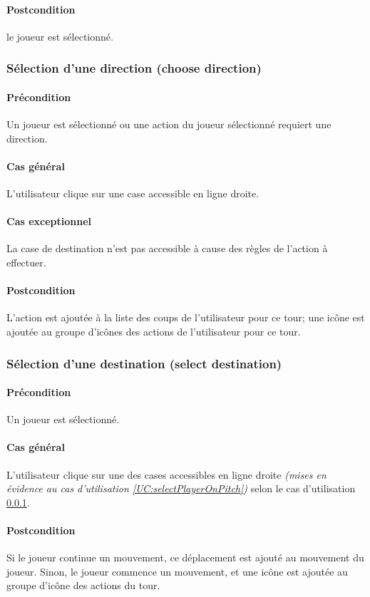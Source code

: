     \paragraph{Postcondition} le joueur est sélectionné. 

\subsubsection{Sélection d'une direction (choose direction)}
    \label{UC:selectDirection}
    \paragraph{Précondition} Un joueur est sélectionné ou une action du joueur sélectionné requiert une direction.
    \paragraph{Cas général} L'utilisateur clique sur une case accessible en ligne droite.
    \paragraph{Cas exceptionnel} La case de destination n'est pas accessible à cause des règles de l'action à effectuer.
    \paragraph{Postcondition} L'action est ajoutée à la liste des coups de l'utilisateur pour ce tour; une icône est ajoutée au groupe d'icônes des actions de l'utilisateur pour ce tour.

\subsubsection{Sélection d'une destination (select destination)}
    \label{UC:selectDestination}
    \paragraph{Précondition} Un joueur est sélectionné.
    \paragraph{Cas général} L'utilisateur clique sur une des cases accessibles en ligne droite \textit{(mises en évidence au cas d'utilisation \ref{UC:selectPlayerOnPitch})} selon le cas d'utilisation \ref{UC:selectDirection}.
    \paragraph{Postcondition} Si le joueur continue un mouvement, ce déplacement est ajouté au mouvement du joueur. Sinon, le joueur commence un mouvement, et une icône est ajoutée au groupe d'icône des actions du tour.

